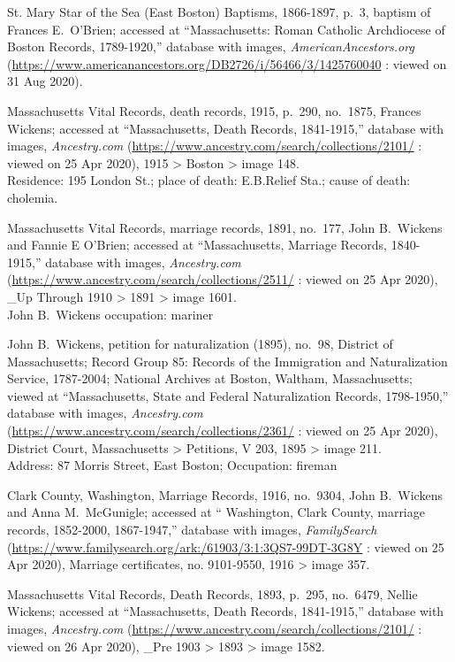 \begin{thebibliography}{999}
	St. Mary Star of the Sea (East Boston) Baptisms, 1866-1897, p.\ 3, baptism of Frances E.\ O'Brien; accessed at ``Massachusetts: Roman Catholic Archdiocese of Boston Records, 1789-1920,'' database with images, \textit{AmericanAncestors.org} (\url{https://www.americanancestors.org/DB2726/i/56466/3/1425760040} : viewed on 31 Aug 2020).
	
	Massachusetts Vital Records, death records, 1915, p.\ 290, no.\ 1875, Frances Wickens; accessed at ``Massachusetts, Death Records, 1841-1915,'' database with images, \textit{Ancestry.com} (\url{https://www.ancestry.com/search/collections/2101/} : viewed on 25 Apr 2020), 1915 > Boston > image 148.\\
	Residence: 195 London St.; place of death: E.B.Relief Sta.; cause of death: cholemia.
	
	Massachusetts Vital Records, marriage records, 1891, no.\ 177, John B.\ Wickens and Fannie E O'Brien; accessed at ``Massachusetts, Marriage Records, 1840-1915,'' database with images, \textit{Ancestry.com} (\url{https://www.ancestry.com/search/collections/2511/} : viewed on 25 Apr 2020), \_Up Through 1910 > 1891 > image 1601.\\
	John B.\ Wickens occupation: mariner
	
	John B.\ Wickens, petition for naturalization (1895), no.\ 98, District of Massachusetts; Record Group 85: Records of the Immigration and Naturalization Service, 1787-2004; National Archives at Boston, Waltham, Massachusetts; viewed at ``Massachusetts, State and Federal Naturalization Records, 1798-1950,'' database with images, \textit{Ancestry.com} (\url{https://www.ancestry.com/search/collections/2361/} : viewed on 25 Apr 2020), District Court, Massachusetts > Petitions, V 203, 1895 > image 211.\\
	Address: 87 Morris Street, East Boston; Occupation: fireman
	
	Clark County, Washington, Marriage Records, 1916, no.\ 9304, John B.\ Wickens and Anna M.\ McGunigle; accessed at `` Washington, Clark County, marriage records, 1852-2000, 1867-1947,'' database with images, \textit{FamilySearch} (\url{https://www.familysearch.org/ark:/61903/3:1:3QS7-99DT-3G8Y} : viewed on 25 Apr 2020), Marriage certificates, no. 9101-9550, 1916 > image 357.
	
	Massachusetts Vital Records, Death Records, 1893, p.\ 295, no.\ 6479, Nellie Wickens; accessed at ``Massachusetts, Death Records, 1841-1915,'' database with images, \textit{Ancestry.com} (\url{https://www.ancestry.com/search/collections/2101/} : viewed on 26 Apr 2020), \_Pre 1903 > 1893 > image 1582.
	

\end{thebibliography}
